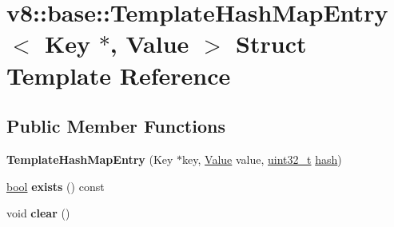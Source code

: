 \hypertarget{structv8_1_1base_1_1TemplateHashMapEntry_3_01Key_01_5_00_01Value_01_4}{}\section{v8\+:\+:base\+:\+:Template\+Hash\+Map\+Entry$<$ Key $\ast$, Value $>$ Struct Template Reference}
\label{structv8_1_1base_1_1TemplateHashMapEntry_3_01Key_01_5_00_01Value_01_4}
\subsection*{Public Member Functions}
\begin{DoxyCompactItemize}
\item 
\mbox{\label{structv8_1_1base_1_1TemplateHashMapEntry_3_01Key_01_5_00_01Value_01_4_a4f04cb46d5cc64ea9c1996ef2a0938d3}} 
{\bfseries Template\+Hash\+Map\+Entry} (Key $\ast$key, \mbox{\hyperlink{classv8_1_1Value}{Value}} value, \mbox{\hyperlink{classuint32__t}{uint32\+\_\+t}} \mbox{\hyperlink{structv8_1_1base_1_1hash}{hash}})
\item 
\mbox{\label{structv8_1_1base_1_1TemplateHashMapEntry_3_01Key_01_5_00_01Value_01_4_a28f47d4ab76268f927cf0261cbafeade}} 
\mbox{\hyperlink{classbool}{bool}} {\bfseries exists} () const
\item 
\mbox{\label{structv8_1_1base_1_1TemplateHashMapEntry_3_01Key_01_5_00_01Value_01_4_ab1c26db3a9d8d8eb5a85a6fc2bff0afd}} 
void {\bfseries clear} ()
\end{DoxyCompactItemize}
